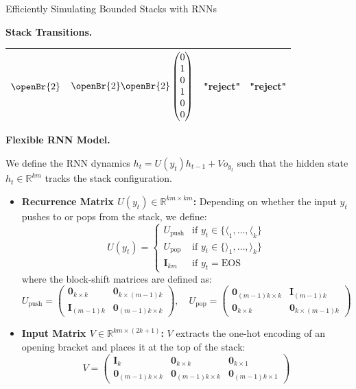 \begin{question}{Efficiently Simulating Bounded Stacks with RNNs}
\begin{subquestion}{\textbf{Stack Transitions.}}
\begin{table}[H]
\begin{tabular}{l|ccc}
            $\openBr{2}$ & $\openBr{2} \openBr{2} \begin{pmatrix} 0 \\ 1 \\ 0 \\ 1 \\ 0 \\ 0 \end{pmatrix}$ & "reject" & "reject" \\
            \bottomrule
        \end{tabular}
    \end{table}

\end{subquestion}

\begin{subquestion}{\textbf{Flexible RNN Model.}}

We define the RNN dynamics $h_t = U(y_t)h_{t-1} + Vo_{y_t}$ such that the hidden state $h_t \in \mathbb{R}^{km}$ tracks the stack configuration.

\begin{itemize}
    \item \textbf{Recurrence Matrix $U(y_t) \in \mathbb{R}^{km \times km}$:} 
    Depending on whether the input $y_t$ pushes to or pops from the stack, we define:
    \[
    U(y_t) = \begin{cases} 
        U_{\text{push}} & \text{if } y_t \in \{ \langle_1, \dots, \langle_k \} \\
        U_{\text{pop}} & \text{if } y_t \in \{ \rangle_1, \dots, \rangle_k \} \\
        \mathbf{I}_{km} & \text{if } y_t = \text{EOS}
    \end{cases}
    \]
    where the block-shift matrices are defined as:
    \[
    U_{\text{push}} = \begin{pmatrix}
        \mathbf{0}_{k \times k} & \mathbf{0}_{k \times (m-1)k} \\
        \mathbf{I}_{(m-1)k} & \mathbf{0}_{(m-1)k \times k}
    \end{pmatrix}, \quad
    U_{\text{pop}} = \begin{pmatrix}
        \mathbf{0}_{(m-1)k \times k} & \mathbf{I}_{(m-1)k} \\
        \mathbf{0}_{k \times k} & \mathbf{0}_{k \times (m-1)k}
    \end{pmatrix}
    \]

    \item \textbf{Input Matrix $V \in \mathbb{R}^{km \times (2k+1)}$:} 
    $V$ extracts the one-hot encoding of an opening bracket and places it at the top of the stack:
    \[
    V = \begin{pmatrix}
        \mathbf{I}_{k} & \mathbf{0}_{k \times k} & \mathbf{0}_{k \times 1} \\
        \mathbf{0}_{(m-1)k \times k} & \mathbf{0}_{(m-1)k \times k} & \mathbf{0}_{(m-1)k \times 1}
    \end{pmatrix}
    \]
\end{itemize}


\end{subquestion}
\end{question}
